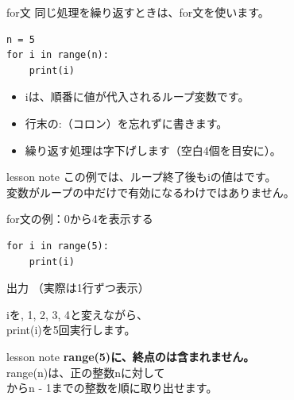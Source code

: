 \documentclass[12pt,aspectratio=43]{beamer}
\newcommand{\code}[1]{{\codefont #1}}
\newcommand{\result}[1]{%
  \par\vspace{1mm}%
  {\small\textcolor{black!60}{出力}}\quad
  {\codefont\fontsize{16}{18}\selectfont #1}\par}
\newenvironment{lessonbox}
  {\begin{beamercolorbox}[wd=\linewidth,sep=1.5mm]{lesson note}}
  {\end{beamercolorbox}\par}
\begin{document}
\begin{frame}[t,fragile]{for文}
  \setlength{\parskip}{0pt}
  同じ処理を繰り返すときは、\code{for}文を使います。
\begin{lstlisting}
n = 5
for i in range(n):
    print(i)
\end{lstlisting}
  \begin{itemize}
    \setlength{\itemsep}{2mm}
    \item \code{i}は、順番に値が代入されるループ変数です。
    \item 行末の\code{:}（コロン）を忘れずに書きます。
    \item 繰り返す処理は字下げします（空白4個を目安に）。
  \end{itemize}
  \vspace{2mm}
  \begin{lessonbox}
    \small この例では、ループ終了後も\code{i}の値は\code{4}です。\\
    変数がループの中だけで有効になるわけではありません。
  \end{lessonbox}
\end{frame}

\begin{frame}[t,fragile]{for文の例：0から4を表示する}
  \setlength{\parskip}{0pt}
\begin{lstlisting}
for i in range(5):
    print(i)
\end{lstlisting}
  \result{0\quad
    {\normalfont\small （実際は1行ずつ表示）}}
  \vspace{3mm}
  \code{i}を\code{0, 1, 2, 3, 4}と変えながら、\\
  \code{print(i)}を5回実行します。
  \par\vspace{4mm}
  \begin{lessonbox}
    \textbf{\code{range(5)}に、終点の\code{5}は含まれません。}\\[1mm]
    \small \code{range(n)}は、正の整数\code{n}に対して\\
    \code{0}から\code{n - 1}までの整数を順に取り出せます。
  \end{lessonbox}
\end{frame}
\end{document}
